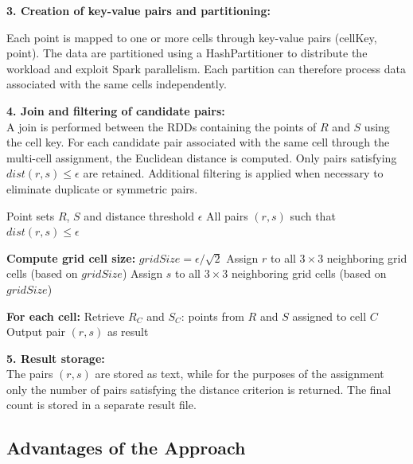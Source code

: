 \documentclass[sigconf,nonacm]{acmart}
\begin{document}
\textbf{3. Creation of key-value pairs and partitioning:} 

Each point is mapped to one or more cells through key-value pairs (cellKey, point). The data are partitioned using a HashPartitioner to distribute the workload and exploit Spark parallelism. Each partition can therefore process data associated with the same cells independently.

\textbf{4. Join and filtering of candidate pairs:} \\
A join is performed between the RDDs containing the points of $R$ and $S$ using the cell key. For each candidate pair associated with the same cell through the multi-cell assignment, the Euclidean distance is computed. Only pairs satisfying $dist(r,s) \leq \epsilon$ are retained. Additional filtering is applied when necessary to eliminate duplicate or symmetric pairs.

\begin{algorithm}[H]
\caption{Basic spatial join algorithm with grid-based indexing}
\begin{algorithmic}[1]
\REQUIRE Point sets $R$, $S$ and distance threshold $\epsilon$
\ENSURE All pairs $(r, s)$ such that $dist(r, s) \leq \epsilon$

\STATE \textbf{Compute grid cell size:} $gridSize = \epsilon / \sqrt{2}$
    \STATE Assign $r$ to all $3\times3$ neighboring grid cells (based on $gridSize$)
\ENDFOR
{}
    \STATE Assign $s$ to all $3\times3$ neighboring grid cells (based on $gridSize$)
\ENDFOR

\STATE \textbf{For each cell:}
    \STATE Retrieve $R_C$ and $S_C$: points from $R$ and $S$ assigned to cell $C$
                \STATE Output pair $(r, s)$ as result
            \ENDIF
        \ENDFOR
    \ENDFOR
\ENDFOR
\end{algorithmic}
\end{algorithm}


\textbf{5. Result storage:} \\
The pairs $(r, s)$ are stored as text, while for the purposes of the assignment only the number of pairs satisfying the distance criterion is returned. The final count is stored in a separate result file.

\subsection*{Advantages of the Approach}
\end{document}
